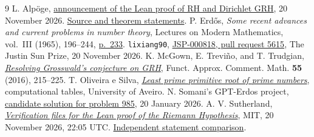 \documentclass[11pt,letterpaper]{amsart}
\begin{document}
\begin{thebibliography}{9}
 L. Alp\"oge, \href{https://alpo.ge/remark.pdf}{announcement of the Lean proof of RH and Dirichlet GRH},
20 November 2026. \href{https://github.com/Deicyde/riemann-hypothesis}{Source and theorem statements}.
 P. Erd\H{o}s, \emph{Some recent advances and current problems in number theory},
Lectures on Modern Mathematics, vol.~III (1965), 196--244, \href{https://www.renyi.hu/~p_erdos/1965-17.pdf\#page=39}{p.~233}.
 \texttt{lixiang90}, \href{https://github.com/TheJustinSunPrize/awards/pull/5615}{JSP-000818, pull request 5615},
The Justin Sun Prize, 20 November 2026.
 K. McGown, E. Trevi\~no, and T. Trudgian,
\href{https://doi.org/10.7169/facm/2016.55.2.5}{\emph{Resolving Grosswald's conjecture on GRH}},
Funct. Approx. Comment. Math. \textbf{55} (2016), 215--225.
 T. Oliveira e Silva, \href{https://sweet.ua.pt/tos/p_roots.html}{\emph{Least prime primitive root of prime numbers}},
computational tables, University of Aveiro.
 N. Somani's GPT-Erdos project, \href{https://github.com/neelsomani/gpt-erdos/blob/9fead6532ee692f2a14d872175c52ddd19656698/data/solutions/985/candidate_solution.md}{candidate solution for problem 985}, 20 January 2026.
 A. V. Sutherland, \href{https://math.mit.edu/~drew/grh/}{\emph{Verification files for the Lean proof of the Riemann Hypothesis}},
MIT, 20 November 2026, 22:05 UTC. \href{https://math.mit.edu/~drew/grh/con-leche-compare.log}{Independent statement comparison}.
\end{thebibliography}
\end{document}
